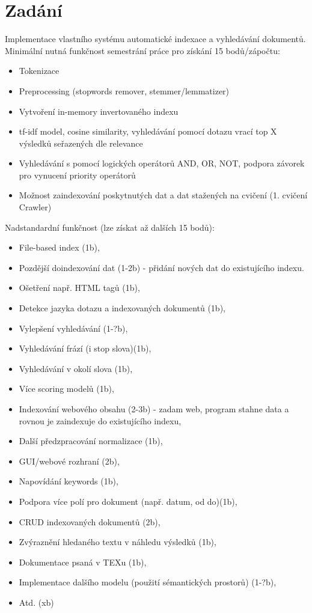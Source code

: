 \documentclass[12pt, a4paper]{article}
\begin{document}
\section{Zadání}
Implementace vlastního systému automatické indexace a vyhledávání dokumentů.
Minimální nutná funkčnost semestrání práce pro získání 15 bodů/zápočtu:
\begin{itemize}
\item Tokenizace
\item Preprocessing (stopwords remover, stemmer/lemmatizer)
\item Vytvoření in-memory invertovaného indexu
\item tf-idf model, cosine similarity, vyhledávání pomocí dotazu vrací top X výsledků seřazených dle relevance
\item Vyhledávání s pomocí logických operátorů AND, OR, NOT, podpora závorek pro vynucení priority operátorů
\item Možnost zaindexování poskytnutých dat a dat stažených na cvičení (1. cvičení Crawler)
\end{itemize}
Nadstandardní funkčnost (lze získat až dalších 15 bodů):
\begin{itemize}
\item File-based index (1b),
\item Pozdější doindexování dat (1-2b) - přidání nových dat do existujícího indexu.
\item Ošetření např. HTML tagů (1b),
\item Detekce jazyka dotazu a indexovaných dokumentů (1b),
\item Vylepšení vyhledávání (1-?b),
\item Vyhledávání frází (i stop slova)(1b),
\item Vyhledávání v okolí slova (1b),
\item Více scoring modelů (1b),
\item Indexování webového obsahu (2-3b) - zadam web, program stahne data a rovnou je zaindexuje do existujícího indexu,
\item Další předzpracování normalizace (1b),
\item GUI/webové rozhraní (2b),
\item Napovídání keywords (1b),
\item Podpora více polí pro dokument (např. datum, od do)(1b),
\item CRUD indexovaných dokumentů (2b),
\item Zvýraznění hledaného textu v náhledu výsledků (1b),
\item Dokumentace psaná v TEXu (1b),
\item Implementace dalšího modelu (použití sémantických prostorů) (1-?b),
\item Atd. (xb)
\end{itemize}
\newpage
\end{document}
